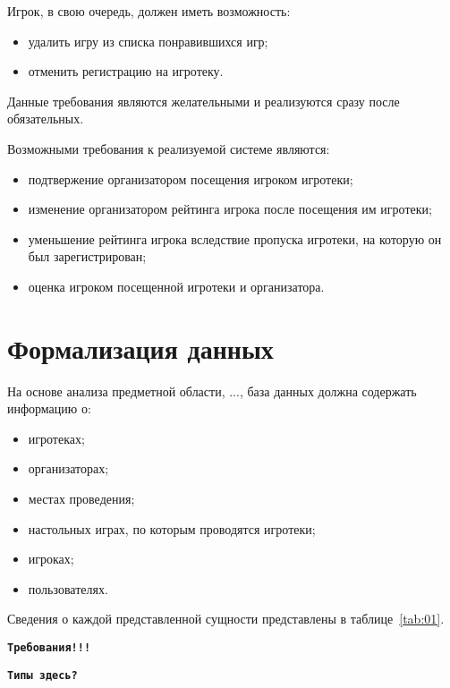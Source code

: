 Игрок, в свою очередь, должен иметь возможность:
\begin{itemize}
    \item удалить игру из списка понравившихся игр;
    \item отменить регистрацию на игротеку.
\end{itemize}

Данные требования являются желательными и реализуются сразу после обязательных.
 
Возможными требования к реализуемой системе являются:
\begin{itemize}
    \item подтвержение организатором посещения игроком игротеки;
    \item изменение организатором рейтинга игрока после посещения им игротеки;
    \item уменьшение рейтинга игрока вследствие пропуска игротеки, на которую он
        был зарегистрирован;
    \item оценка игроком посещенной игротеки и организатора.
\end{itemize}


\section{Формализация данных}

На основе анализа предметной области, ..., база данных должна содержать
информацию о:

\begin{itemize}
    \item игротеках;
    \item организаторах;
    \item местах проведения;
    \item настольных играх, по которым проводятся игротеки;
    \item игроках;
    \item пользователях.
\end{itemize}

Сведения о каждой представленной сущности представлены в таблице~\ref{tab:01}.

\textbf{\texttt{Требования!!!}}

\textbf{\texttt{Типы здесь?}}

